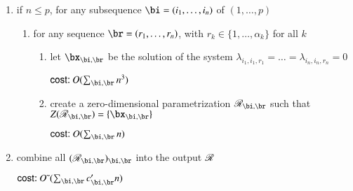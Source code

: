 \documentclass[amsthm]{elsart}
\begin{document}
\begin{algorithm}[!t]
\begin{enumerate}
\item if $n \le p$, for any subsequence $\bi = (i_1, \ldots, i_n)$ of $(1, \ldots, p)$
  \begin{enumerate}
  \item for any sequence $\br = (r_1, \ldots, r_n)$, with $r_k \in \{1,\dots,\alpha_k\}$ for all $k$
    \begin{enumerate}
    \item let $\bx_{\bi,\br}$ be the solution of the system $\lambda_{i_1,i_1,r_1}=\dots=\lambda_{i_n,i_n,r_n}=0$

\hfill      $\text{\sf{cost:~}} O(\sum_{\bi,\br}n^3)$
    \item create a zero-dimensional parametrization $\scrR_{\bi,\br}$ such that $Z(\scrR_{\bi,\br})=\{\bx_{\bi,\br}\}$

\hfill      $\text{\sf{cost:~}} O(\sum_{\bi,\br}n)$
  \end{enumerate}
\end{enumerate}
\item combine all $(\scrR_{\bi,\br})_{\bi,\br}$ into the output $\mathscr{R}$

\hfill  $\text{\sf{cost:~}} \softO(\sum_{\bi,\br}  c'_{\bi,\br} n)$
\end{enumerate}
\label{Row}
\end{algorithm}
\end{document}
